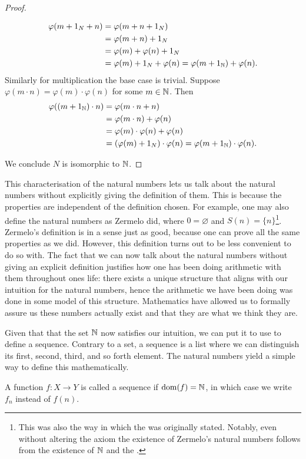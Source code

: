 \documentclass[../main.tex]{subfiles}
\begin{document}
\begin{proof}
\begin{description}
        \begin{align*}
            \varphi(m+1_N+n) & =\varphi(m+n+1_N) \\
            & =\varphi(m+n)+1_N \\
            & =\varphi(m)+\varphi(n)+1_N \\
            & =\varphi(m)+1_N+\varphi(n)=\varphi(m+1_{\mathbb{N}})+\varphi(n).
        \end{align*}
        Similarly for multiplication the base case is trivial. Suppose $\varphi(m\cdot n)=\varphi(m)\cdot\varphi(n)$ for some $m\in\mathbb{N}$. Then
        \begin{align*}
            \varphi((m+1_{\mathbb{N}})\cdot n) & =\varphi(m\cdot n+n) \\
            & =\varphi(m\cdot n)+\varphi(n) \\
            & =\varphi(m)\cdot\varphi(n)+\varphi(n) \\
            & =(\varphi(m)+1_N)\cdot\varphi(n)=\varphi(m+1_{\mathbb{N}})\cdot\varphi(n).
        \end{align*}
    \end{description}
    We conclude $N$ is isomorphic to $\mathbb{N}$.
\end{proof}
This characterisation of the natural numbers lets us talk about the natural numbers without explicitly giving the definition of them. This is because the properties are independent of the definition chosen. For example, one may also define the natural numbers as Zermelo did, where $0=\varnothing$ and $S(n)=\{n\}$\footnote{This was also the way in which the  was originally stated. Notably, even without altering the axiom the existence of Zermelo's natural numbers follows from the existence of $\mathbb{N}$ and the .}. Zermelo's definition is in a sense just as good, because one can prove all the same properties as we did. However, this definition turns out to be less convenient to do so with. The fact that we can now talk about the natural numbers without giving an explicit definition justifies how one has been doing arithmetic with them throughout ones life: there exists a unique structure that aligns with our intuition for the natural numbers, hence the arithmetic we have been doing was done in some model of this structure. Mathematics have allowed us to formally assure us these numbers actually exist and that they are what we think they are.

Given that that the set $\mathbb{N}$ now satisfies our intuition, we can put it to use to define a sequence. Contrary to a set, a sequence is a list where we can distinguish its first, second, third, and so forth element. The natural numbers yield a simple way to define this mathematically.
\begin{definition}[Sequence]
    A function $f:X\to Y$ is called a sequence if $\operatorname{dom}(f)=\mathbb{N}$, in which case we write $f_n$ instead of $f(n)$.
\end{definition}
\end{document}
